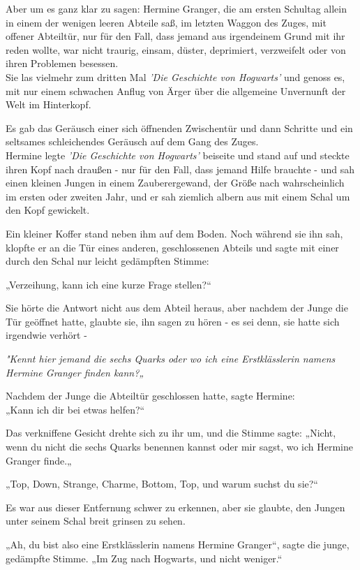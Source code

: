 {Aber um es ganz klar zu sagen: Hermine Granger, die am ersten Schultag allein in einem der wenigen leeren Abteile saß, im letzten Waggon des Zuges, mit offener Abteiltür, nur für den Fall, dass jemand aus irgendeinem Grund mit ihr reden wollte, war nicht traurig, einsam, düster, deprimiert, verzweifelt oder von ihren Problemen besessen.\\ Sie las vielmehr zum dritten Mal \emph{'Die Geschichte von Hogwarts'} und genoss es, mit nur einem schwachen Anflug von Ärger über die allgemeine Unvernunft der Welt im Hinterkopf.

Es gab das Geräusch einer sich öffnenden Zwischentür und dann Schritte und ein seltsames schleichendes Geräusch auf dem Gang des Zuges.\\ Hermine legte \emph{'Die Geschichte von Hogwarts'} beiseite und stand auf und steckte ihren Kopf nach draußen - nur für den Fall, dass jemand Hilfe brauchte - und sah einen kleinen Jungen in einem Zauberergewand, der Größe nach wahrscheinlich im ersten oder zweiten Jahr, und er sah ziemlich albern aus mit einem Schal um den Kopf gewickelt.

Ein kleiner Koffer stand neben ihm auf dem Boden. Noch während sie ihn sah, klopfte er an die Tür eines anderen, geschlossenen Abteils und sagte mit einer durch den Schal nur leicht gedämpften Stimme:

„Verzeihung, kann ich eine kurze Frage stellen?“

Sie hörte die Antwort nicht aus dem Abteil heraus, aber nachdem der Junge die Tür geöffnet hatte, glaubte sie, ihn sagen zu hören - es sei denn, sie hatte sich irgendwie verhört -

\emph{"Kennt hier jemand die sechs Quarks oder wo ich eine Erstklässlerin namens Hermine Granger finden kann?„}

Nachdem der Junge die Abteiltür geschlossen hatte, sagte Hermine:\\ „Kann ich dir bei etwas helfen?“

Das verkniffene Gesicht drehte sich zu ihr um, und die Stimme sagte: „Nicht, wenn du nicht die sechs Quarks benennen kannst oder mir sagst, wo ich Hermine Granger finde.„

„Top, Down, Strange, Charme, Bottom, Top, und warum suchst du sie?“

Es war aus dieser Entfernung schwer zu erkennen, aber sie glaubte, den Jungen unter seinem Schal breit grinsen zu sehen.

„Ah, du bist also eine Erstklässlerin namens Hermine Granger“, sagte die junge, gedämpfte Stimme. „Im Zug nach Hogwarts, und nicht weniger.“

}
